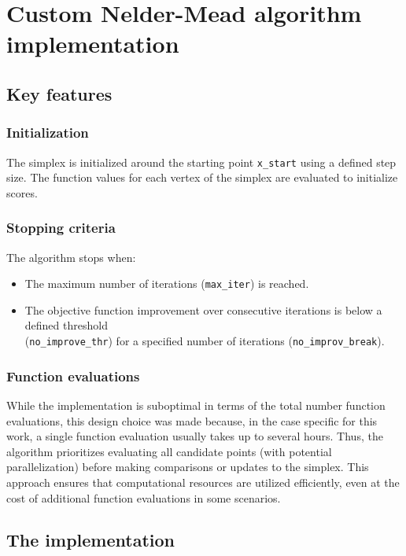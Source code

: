 \chapter{Custom Nelder-Mead algorithm implementation}\label{appendix B}

\section{Key features}

\subsection*{Initialization}
The simplex is initialized around the starting point \texttt{x\_start} using a defined step size. The function values for each vertex of the simplex are evaluated to initialize scores.

\subsection*{Stopping criteria}
The algorithm stops when:
\begin{itemize}
	\item The maximum number of iterations (\texttt{max\_iter}) is reached.
	\item The objective function improvement over consecutive iterations is below a defined threshold\\ (\texttt{no\_improve\_thr}) for a specified number of iterations (\texttt{no\_improv\_break}).
\end{itemize}

\subsection*{Function evaluations}
While the implementation is suboptimal in terms of the total number function evaluations, this design choice was made because, in the case specific for this work, a single function evaluation usually takes up to several hours. Thus, the algorithm prioritizes evaluating all candidate points (with potential parallelization) before making comparisons or updates to the simplex. This approach ensures that computational resources are utilized efficiently, even at the cost of additional function evaluations in some scenarios.

\section{The implementation}


